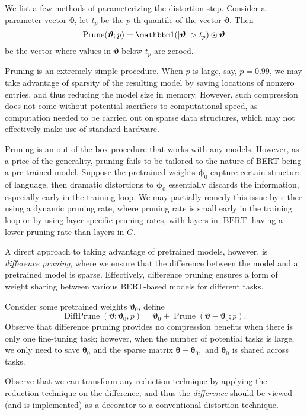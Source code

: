 \documentclass[10pt]{article}
\newcommand{\bert}{\operatorname{BERT}}
\newcommand{\prune}{\operatorname{Prune}}
\newcommand{\diffprune}{\operatorname{DiffPrune}}
\newcommand{\btheta}{{\bm{\theta}}}
\newcommand{\bphi}{{\bm{\phi}}}
\newcommand{\bvartheta}{{\bm{\vartheta}}}
\begin{document}
We list a few methods of parameterizing the distortion step. 
 Consider a parameter vector $\bvartheta$, let
  $t_p$ be the $p$-th quantile of the vector $\bvartheta$. Then \[
  \prune(\bvartheta; p) = \one(|\bvartheta| > t_p) \odot \bvartheta
  \]
  be the vector where values in $\bvartheta$ below $t_p$ are zeroed. 
  
  Pruning is an extremely simple procedure. When $p$ is large, say, $p=0.99$,
  we may take advantage of sparsity of the resulting model by saving locations
  of nonzero entries, and thus reducing the model size in memory. However,
  such compression does not come without potential sacrifices to computational
  speed, as computation needed to be carried out on sparse data structures,
  which may not effectively make use of standard hardware.
  
  Pruning is an out-of-the-box procedure that works with any models. However,
  as a price of the generality, pruning fails to be tailored to the nature of
  BERT being a pre-trained model. Suppose the pretrained weights $\bphi_0 $
  capture certain structure of language, then dramatic distortions to
  $\bphi_0$ essentially discards the information, especially early in the
  training loop. We may partially remedy this issue by either using a dynamic
  pruning rate, where pruning rate is small early in the training loop or by
  using layer-specific pruning rates, with layers in $\bert$ having a lower
  pruning rate than layers in $G$. 
  
  A direct approach to taking advantage of pretrained models, however, is
  \emph{difference pruning}, where we ensure that the difference between the
  model and a pretrained model is sparse. Effectively, difference pruning
  ensures a form of weight sharing between various BERT-based models for
  different tasks.
  
 Consider some pretrained weights
$\bvartheta_0$, define \[
\diffprune(\bvartheta; \bvartheta_0, p ) = \bvartheta_0 + \prune(\bvartheta -
\bvartheta_0 ; p). 
\]
Observe that difference pruning provides no compression benefits when there is
only one fine-tuning task; however, when the number of potential tasks is
large, we only need to save $\btheta_0$ and the sparse matrix $\btheta -
\btheta_0,$ and $\btheta_0$ is shared across tasks.

Observe that we can transform any reduction technique by applying the
reduction technique on the difference, and thus the \emph{difference} should
be viewed (and is implemented) as a decorator to a conventional distortion
technique.
\end{document}
